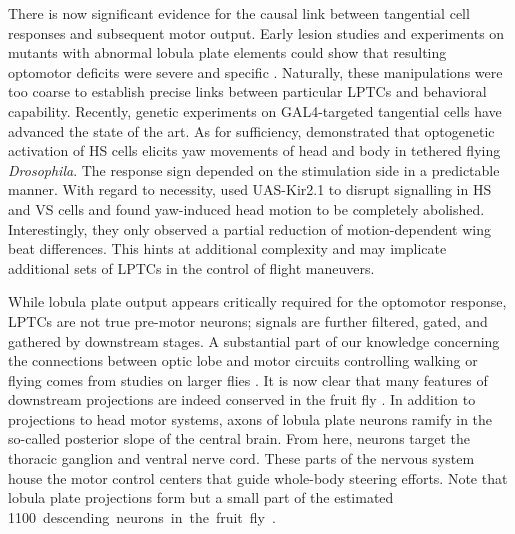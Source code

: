 There is now significant evidence for the causal link between tangential cell responses and subsequent motor output. Early lesion studies and experiments on mutants with abnormal lobula plate elements could show that resulting optomotor deficits were severe and specific \citep{Heisenberg:1978aa,Geiger:1981aa,Hausen:1983js}. Naturally, these manipulations were too coarse to establish precise links between particular LPTCs and behavioral capability. Recently, genetic experiments on GAL4-targeted tangential cells have advanced the state of the art. As for sufficiency, \citet{Haikala:2013cm} demonstrated that optogenetic activation of HS cells elicits yaw movements of head and body in tethered flying \textit{Drosophila}. The response sign depended on the stimulation side in a predictable manner. With regard to necessity, \citet{Kim:2017aa} used UAS-Kir2.1 to disrupt signalling in HS and VS cells and found yaw-induced head motion to be completely abolished. Interestingly, they only observed a partial reduction of motion-dependent wing beat differences. This hints at additional complexity and may implicate additional sets of LPTCs in the control of flight maneuvers.

While lobula plate output appears critically required for the optomotor response, LPTCs are not true pre-motor neurons; signals are further filtered, gated, and gathered by downstream stages. A substantial part of our knowledge concerning the connections between optic lobe and motor circuits controlling walking or flying comes from studies on larger flies \citep{Strausfeld:1985aa,Strausfeld:1990aa,Haag:2007ir,Wertz:2008jt}. It is now clear that many features of downstream projections are indeed conserved in the fruit fly \citep[for instance, see][]{Suver:2016aa}. In addition to projections to head motor systems, axons of lobula plate neurons ramify in the so-called posterior slope of the central brain. From here, neurons target the thoracic ganglion and ventral nerve cord. These parts of the nervous system house the motor control centers that guide whole-body steering efforts. Note that lobula plate projections form but a small part of the estimated \SI{1100} descending neurons in the fruit fly \citep{Hsu:2016aa}.


